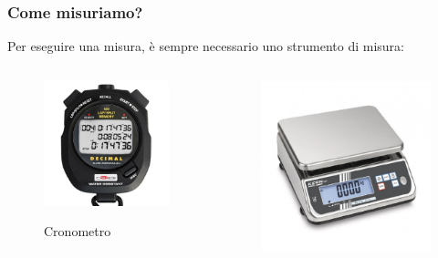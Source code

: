 \documentclass[handout]{beamer}
\theoremstyle{plain}
\begin{document}
\begin{frame}
\frametitle{Come misuriamo?}
Per eseguire una misura, è sempre necessario uno \alert{strumento di misura}:
\begin{columns}
  \begin{column}{0.25\textwidth}
  \begin{figure}
    \includegraphics[width=\columnwidth]{img/cronometro.jpg}

    Cronometro
  \end{figure}    
  \end{column}
  \begin{column}{0.25\textwidth}
  \begin{figure}
    \includegraphics[width=\columnwidth]{img/bilancia.jpg}


\end{figure}
\end{column}
\end{columns}
\end{frame}
\end{document}
